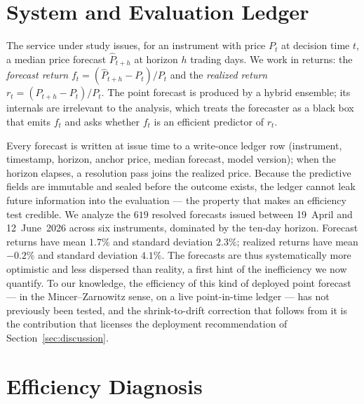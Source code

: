 \documentclass[10pt,twocolumn,twoside]{eec_style}
\newcommand{\refsec}[1]{Section~\ref{sec:#1}}
\begin{document}
\section{System and Evaluation Ledger}
\label{sec:system}
The service under study issues, for an instrument with price $P_t$ at decision time $t$, a
median price forecast $\hat{P}_{t+h}$ at horizon $h$ trading days. We work in returns:
the \emph{forecast return} $f_t=(\hat{P}_{t+h}-P_t)/P_t$ and the \emph{realized return}
$r_t=(P_{t+h}-P_t)/P_t$. The point forecast is produced by a hybrid ensemble; its
internals are irrelevant to the analysis, which treats the forecaster as a black box that
emits $f_t$ and asks whether $f_t$ is an efficient predictor of $r_t$.

Every forecast is written at issue time to a write-once ledger row (instrument,
timestamp, horizon, anchor price, median forecast, model version); when the horizon
elapses, a resolution pass joins the realized price. Because the predictive fields are
immutable and sealed before the outcome exists, the ledger cannot leak future
information into the evaluation --- the property that makes an efficiency test credible.
We analyze the $619$ resolved forecasts issued between 19~April and 12~June~2026 across
six instruments, dominated by the ten-day horizon. Forecast returns have mean $1.7\%$
and standard deviation $2.3\%$; realized returns have mean $-0.2\%$ and standard
deviation $4.1\%$. The forecasts are thus systematically more optimistic and less
dispersed than reality, a first hint of the inefficiency we now quantify. To our
knowledge, the efficiency of this kind of deployed point forecast --- in the
Mincer--Zarnowitz sense, on a live point-in-time ledger --- has not previously been
tested, and the shrink-to-drift correction that follows from it is the contribution that
licenses the deployment recommendation of \refsec{discussion}.

\section{Efficiency Diagnosis}
\label{sec:diagnosis}
\end{document}

